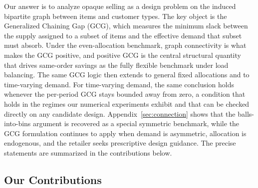 Our answer is to analyze opaque selling as a design problem on the induced bipartite graph between items and customer types.
The key object is the Generalized Chaining Gap (GCG), which measures the minimum slack between the supply assigned to a subset of items and the effective demand that subset must absorb.
Under the even-allocation benchmark, graph connectivity is what makes the GCG positive, and positive GCG is the central structural quantity that drives same-order savings as the fully flexible benchmark under load balancing.
The same GCG logic then extends to general fixed allocations and to time-varying demand.
For time-varying demand, the same conclusion holds whenever the per-period GCG stays bounded away from zero, a condition that holds in the regimes our numerical experiments exhibit and that can be checked directly on any candidate design.
Appendix~\ref{sec:connection} shows that the balls-into-bins argument is recovered as a special symmetric benchmark, while the GCG formulation continues to apply when demand is asymmetric, allocation is endogenous, and the retailer seeks prescriptive design guidance.
The precise statements are summarized in the contributions below.

\subsection*{Our Contributions}

